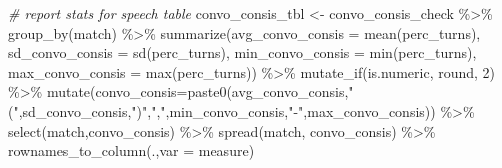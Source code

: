 \documentclass[
]{article}
\newenvironment{Shaded}{\begin{snugshade}}{\end{snugshade}}
\newcommand{\AttributeTok}[1]{\textcolor[rgb]{0.77,0.63,0.00}{#1}}
\newcommand{\CommentTok}[1]{\textcolor[rgb]{0.56,0.35,0.01}{\textit{#1}}}
\newcommand{\DecValTok}[1]{\textcolor[rgb]{0.00,0.00,0.81}{#1}}
\newcommand{\FunctionTok}[1]{\textcolor[rgb]{0.00,0.00,0.00}{#1}}
\newcommand{\NormalTok}[1]{#1}
\newcommand{\OtherTok}[1]{\textcolor[rgb]{0.56,0.35,0.01}{#1}}
\newcommand{\SpecialCharTok}[1]{\textcolor[rgb]{0.00,0.00,0.00}{#1}}
\newcommand{\StringTok}[1]{\textcolor[rgb]{0.31,0.60,0.02}{#1}}
\begin{document}
\begin{Shaded}
\begin{Highlighting}[]
\CommentTok{\# report stats for speech table}
\NormalTok{convo\_consis\_tbl }\OtherTok{\textless{}{-}}\NormalTok{ convo\_consis\_check }\SpecialCharTok{\%\textgreater{}\%}
  \FunctionTok{group\_by}\NormalTok{(match) }\SpecialCharTok{\%\textgreater{}\%}
  \FunctionTok{summarize}\NormalTok{(}\AttributeTok{avg\_convo\_consis =} \FunctionTok{mean}\NormalTok{(perc\_turns),}
            \AttributeTok{sd\_convo\_consis =} \FunctionTok{sd}\NormalTok{(perc\_turns),}
            \AttributeTok{min\_convo\_consis =} \FunctionTok{min}\NormalTok{(perc\_turns),}
            \AttributeTok{max\_convo\_consis =} \FunctionTok{max}\NormalTok{(perc\_turns)) }\SpecialCharTok{\%\textgreater{}\%}
  \FunctionTok{mutate\_if}\NormalTok{(is.numeric, round, }\DecValTok{2}\NormalTok{) }\SpecialCharTok{\%\textgreater{}\%}
  \FunctionTok{mutate}\NormalTok{(}\AttributeTok{convo\_consis=}\FunctionTok{paste0}\NormalTok{(avg\_convo\_consis,}\StringTok{"("}\NormalTok{,sd\_convo\_consis,}\StringTok{")"}\NormalTok{,}\StringTok{","}\NormalTok{,min\_convo\_consis,}\StringTok{"{-}"}\NormalTok{,max\_convo\_consis)) }\SpecialCharTok{\%\textgreater{}\%}
  \FunctionTok{select}\NormalTok{(match,convo\_consis) }\SpecialCharTok{\%\textgreater{}\%}
  \FunctionTok{spread}\NormalTok{(match, convo\_consis) }\SpecialCharTok{\%\textgreater{}\%}
  \FunctionTok{rownames\_to\_column}\NormalTok{(.,}\AttributeTok{var =} \StringTok{\textquotesingle{}measure\textquotesingle{}}\NormalTok{)}
\end{Highlighting}
\end{Shaded}
\end{document}
